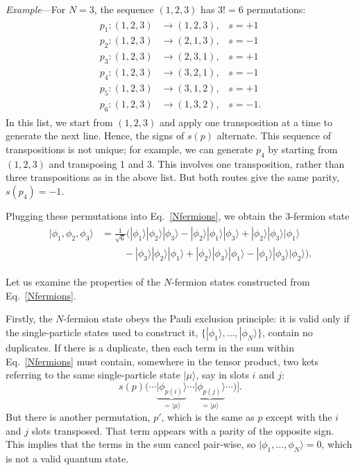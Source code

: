 \documentclass[prx,12pt]{revtex4-2}
\begin{document}
\begin{framed}
\noindent
\textit{Example}---For $N=3$, the sequence $(1,2,3)$ has $3!=6$ permutations:
\begin{align}
  \begin{aligned}
  p_1 : (1,2,3) &\rightarrow (1,2,3), \;\;\;s = +1 \\
  p_2 : (1,2,3) &\rightarrow (2,1,3), \;\;\;s = -1 \\
  p_3 : (1,2,3) &\rightarrow (2,3,1), \;\;\;s = +1 \\
  p_4 : (1,2,3) &\rightarrow (3,2,1), \;\;\;s = -1 \\
  p_5 : (1,2,3) &\rightarrow (3,1,2), \;\;\;s = +1 \\
  p_6 : (1,2,3) &\rightarrow (1,3,2), \;\;\;s = -1.\end{aligned}
\end{align}
In this list, we start from $(1,2,3)$ and apply one transposition at a
time to generate the next line.  Hence, the signs of $s(p)$ alternate.
This sequence of transpositions is not unique; for example, we can
generate $p_4$ by starting from $(1,2,3)$ and transposing 1 and 3.
This involves one transposition, rather than three transpositions as
in the above list.  But both routes give the same parity, $s(p_4) =
-1$.

Plugging these permutations into Eq.~\eqref{Nfermions}, we obtain the
3-fermion state
\begin{align}
  \begin{aligned}
    |\phi_1, \phi_2, \phi_3\rangle
    &= \frac{1}{\sqrt{6}} \Big(
    |\phi_1\rangle |\phi_2\rangle |\phi_3\rangle
    - |\phi_2\rangle |\phi_1\rangle |\phi_3\rangle
    + |\phi_2\rangle |\phi_3\rangle |\phi_1\rangle \\
    & \qquad\; 
    - |\phi_3\rangle |\phi_2\rangle |\phi_1\rangle
    + |\phi_2\rangle |\phi_3\rangle |\phi_1\rangle
    - |\phi_1\rangle |\phi_3\rangle |\phi_2\rangle \Big).
  \end{aligned}
\end{align}
\end{framed}

Let us examine the properties of the $N$-fermion states constructed
from Eq.~\eqref{Nfermions}.

Firstly, the $N$-fermion state obeys the Pauli exclusion principle: it
is valid only if the single-particle states used to construct it,
$\{|\phi_1\rangle, \dots, |\phi_N\rangle\}$, contain no duplicates.
If there is a duplicate, then each term in the sum within
Eq.~\eqref{Nfermions} must contain, somewhere in the tensor product,
two kets referring to the same single-particle state $|\mu\rangle$,
say in slots $i$ and $j$:
\begin{equation*}
s(p)\big( \cdots
      \underbrace{|\phi_{p(i)}\rangle}_{= |\mu\rangle} \cdots
      \underbrace{|\phi_{p(j)}\rangle}_{= |\mu\rangle} \cdots \big)\Big].
\end{equation*}
But there is another permutation, $p'$, which is the same as $p$
except with the $i$ and $j$ slots transposed.  That term appears with
a parity of the opposite sign.  This implies that the terms in the sum
cancel pair-wise, so $|\phi_1,\dots,\phi_N\rangle = 0$, which is not a
valid quantum state.
\end{document}
